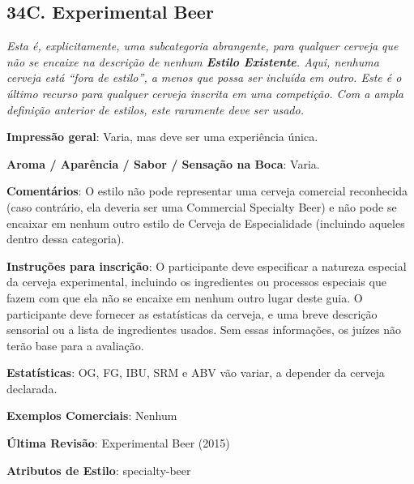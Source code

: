 \subsection*{34C. Experimental Beer}

\textit{Esta é, explicitamente, uma subcategoria abrangente, para qualquer cerveja que não se encaixe na descrição de nenhum \textbf{Estilo Existente}. Aqui, nenhuma cerveja está “fora de estilo”, a menos que possa ser incluída em outro. Este é o último recurso para qualquer cerveja inscrita em uma competição. Com a ampla definição anterior de estilos, este raramente deve ser usado.}

\textbf{Impressão geral}: Varia, mas deve ser uma experiência única.

\textbf{Aroma / Aparência / Sabor / Sensação na Boca}: Varia.

\textbf{Comentários}: O estilo não pode representar uma cerveja comercial reconhecida (caso contrário, ela deveria ser uma Commercial Specialty Beer) e não pode se encaixar em nenhum outro estilo de Cerveja de Especialidade (incluindo aqueles dentro dessa categoria).

\textbf{Instruções para inscrição}: O participante deve especificar a natureza especial da cerveja experimental, incluindo os ingredientes ou processos especiais que fazem com que ela não se encaixe em nenhum outro lugar deste guia. O participante deve fornecer as estatísticas da cerveja, e uma breve descrição sensorial ou a lista de ingredientes usados. Sem essas informações, os juízes não terão base para a avaliação.

\textbf{Estatísticas}: OG, FG, IBU, SRM e ABV vão variar, a depender da cerveja declarada.

\textbf{Exemplos Comerciais}: Nenhum

\textbf{Última Revisão}: Experimental Beer (2015)

\textbf{Atributos de Estilo}: specialty-beer
